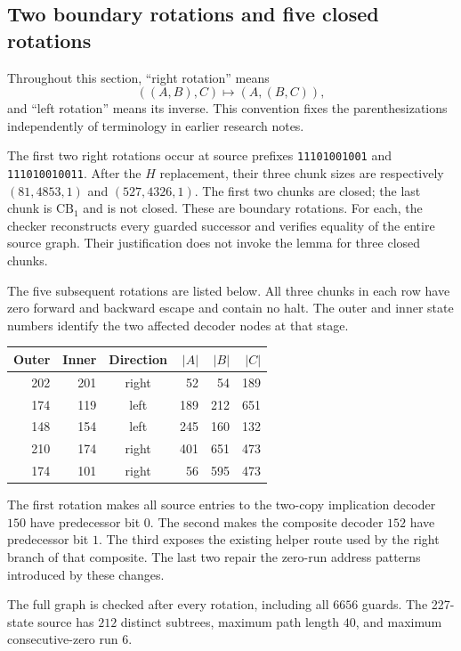 \subsection{Two boundary rotations and five closed rotations}

Throughout this section, ``right rotation'' means
\[
 ((A,B),C)\longmapsto(A,(B,C)),
\]
and ``left rotation'' means its inverse.  This convention fixes the
parenthesizations independently of terminology in earlier research notes.

The first two right rotations occur at source prefixes
\texttt{11101001001} and \texttt{111010010011}.
After the $H$ replacement, their three chunk sizes are respectively
$(81,4853,1)$ and $(527,4326,1)$.  The first two chunks are closed;
the last chunk is $\mathrm{CB}_1$ and is not closed.  These are boundary
rotations.  For each, the checker reconstructs every guarded successor
and verifies equality of the entire source graph.  Their justification
does not invoke the lemma for three closed chunks.

The five subsequent rotations are listed below.  All three chunks in
each row have zero forward and backward escape and contain no halt.
The outer and inner state numbers identify the two affected decoder
nodes at that stage.

\begin{center}
\begin{tabular}{r r c r r r}
Outer & Inner & Direction & $|A|$ & $|B|$ & $|C|$\\
\hline
202 & 201 & right & 52 & 54 & 189\\
174 & 119 & left  & 189 & 212 & 651\\
148 & 154 & left  & 245 & 160 & 132\\
210 & 174 & right & 401 & 651 & 473\\
174 & 101 & right & 56 & 595 & 473
\end{tabular}
\end{center}

The first rotation makes all source entries to the two-copy implication
decoder $150$ have predecessor bit $0$.  The second makes the composite
decoder $152$ have predecessor bit $1$.  The third exposes the existing
helper route used by the right branch of that composite.  The last two
repair the zero-run address patterns introduced by these changes.

The full graph is checked after every rotation, including all $6656$
guards.  The 227-state source has $212$ distinct subtrees, maximum path
length $40$, and maximum consecutive-zero run $6$.

